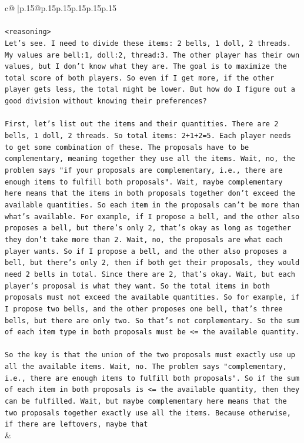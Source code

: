 \documentclass{article}
\begin{document}
{\begin{supertabular}{c@{$\;$}|p{.15\linewidth}@{}p{.15\linewidth}p{.15\linewidth}p{.15\linewidth}p{.15\linewidth}p{.15\linewidth}}
{{{\\ 
\\ 
\texttt{<reasoning>} \\
\texttt{Let's see. I need to divide these items: 2 bells, 1 doll, 2 threads. My values are bell:1, doll:2, thread:3. The other player has their own values, but I don't know what they are. The goal is to maximize the total score of both players. So even if I get more, if the other player gets less, the total might be lower. But how do I figure out a good division without knowing their preferences?} \\
\\ 
\texttt{First, let's list out the items and their quantities. There are 2 bells, 1 doll, 2 threads. So total items: 2+1+2=5. Each player needs to get some combination of these. The proposals have to be complementary, meaning together they use all the items. Wait, no, the problem says "if your proposals are complementary, i.e., there are enough items to fulfill both proposals". Wait, maybe complementary here means that the items in both proposals together don't exceed the available quantities. So each item in the proposals can't be more than what's available. For example, if I propose a bell, and the other also proposes a bell, but there's only 2, that's okay as long as together they don't take more than 2. Wait, no, the proposals are what each player wants. So if I propose a bell, and the other also proposes a bell, but there's only 2, then if both get their proposals, they would need 2 bells in total. Since there are 2, that's okay. Wait, but each player's proposal is what they want. So the total items in both proposals must not exceed the available quantities. So for example, if I propose two bells, and the other proposes one bell, that's three bells, but there are only two. So that's not complementary. So the sum of each item type in both proposals must be <= the available quantity.} \\
\\ 
\texttt{So the key is that the union of the two proposals must exactly use up all the available items. Wait, no. The problem says "complementary, i.e., there are enough items to fulfill both proposals". So if the sum of each item in both proposals is <= the available quantity, then they can be fulfilled. Wait, but maybe complementary here means that the two proposals together exactly use all the items. Because otherwise, if there are leftovers, maybe that} \\
            }
        }
    }
    & \\ \\


\end{supertabular}}
\end{document}
